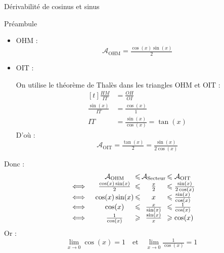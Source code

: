 \documentclass{cours}
\let\frac\tfrac %
\begin{document}
\begin{Gpartie}{Dérivabilité de cosinus et sinus}
\begin{Spartie}{Préambule}
\begin{itemize}
                \item $\mathrm{OHM}$ : \[\mathcal{A}_\mathrm{OHM}=\frac{\cos(x)\sin(x)}{2}\]

                \item $\mathrm{OIT}$ :
                
                On utilise le théorème de Thalès dans les triangles $\mathrm{OHM}$ et $\mathrm{OIT}$ : 
                \[\begin{aligned}[t]
                    \frac{HM}{IT} &= \frac{OH}{OI} \\[1.5ex]
                    \frac{\sin(x)}{IT} &=\frac{\cos(x)}{1} \\[1.5ex]
                    IT &= \frac{\sin(x)}{\cos(x)}=\tan(x)
                \end{aligned}\]
                D'où :  \[\mathcal{A}_\mathrm{OIT}=\frac{\tan(x)}{2}=\frac{\sin(x)}{2\cos(x)}\]
            \end{itemize}
        
            \renewcommand*{\arraystretch}{2} %

            Donc :~
            \[\begin{array}{ r@{\,} c@{\,} c@{\,} c@{\,} l@{\,} }
                    &\quad\mathcal{A}_\mathrm{OHM}  & \leq & \mathcal{A}_\text{Secteur} & \leq\mathcal{A}_\mathrm{OIT} \\
                \iff&\quad\frac{\cos(x)\sin(x)}{2}  & \leq & \frac{x}{2}                & \leq\frac{\sin(x)}{2\cos(x)} \\
                \iff&\quad\cos(x)\sin(x)            & \leq & x                          & \leq\frac{\sin(x)}{\cos(x)} \\
                \iff&\quad\cos(x)                   & \leq & \frac{x}{\sin(x)}          & \leq\frac{1}{\cos(x)} \\
                \iff&\quad\frac{1}{\cos(x)}         & \geq & \frac{\sin(x)}{x}          & \geq\cos(x) 
            \end{array}\]
            Or : \[\lim\limits_{x\to0}\cos(x)=1\quad\text{et}\quad\lim\limits_{x\to0}\frac{1}{\cos(x)}=1\]


\end{Spartie}
\end{Gpartie}
\end{document}
